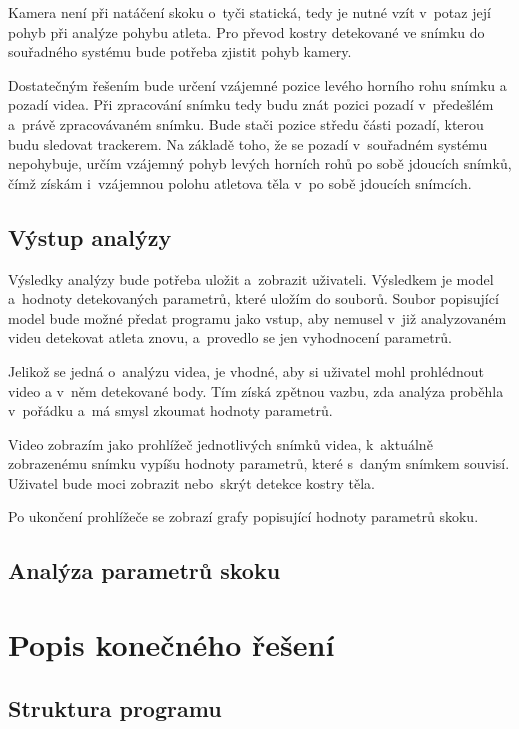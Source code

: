 Kamera není při natáčení skoku o~tyči statická, tedy je nutné vzít v~potaz její pohyb při analýze pohybu atleta. Pro převod kostry detekované ve snímku do souřadného systému bude potřeba zjistit pohyb kamery.

Dostatečným řešením bude určení vzájemné pozice levého horního rohu snímku a pozadí videa. Při zpracování snímku tedy budu znát pozici pozadí v~předešlém a~právě zpracovávaném snímku. Bude stači pozice středu části pozadí, kterou budu sledovat trackerem. Na základě toho, že se pozadí v~souřadném systému nepohybuje, určím vzájemný pohyb levých horních rohů po sobě jdoucích snímků, čímž získám i~vzájemnou polohu atletova těla v~po sobě jdoucích snímcích.

\subsection{Výstup analýzy}

Výsledky analýzy bude potřeba uložit a~zobrazit uživateli. Výsledkem je model a~hodnoty detekovaných parametrů, které uložím do souborů. Soubor popisující model bude možné předat programu jako vstup, aby nemusel v~již analyzovaném videu detekovat atleta znovu, a~provedlo se jen vyhodnocení parametrů.

Jelikož se jedná o~analýzu videa, je vhodné, aby si uživatel mohl prohlédnout video a v~něm detekované body. Tím získá zpětnou vazbu, zda analýza proběhla v~pořádku a~má smysl zkoumat hodnoty parametrů.

Video zobrazím jako prohlížeč jednotlivých snímků videa, k~aktuálně zobrazenému snímku vypíšu hodnoty parametrů, které s~daným snímkem souvisí. Uživatel bude moci zobrazit nebo~skrýt detekce kostry těla.

Po ukončení prohlížeče se zobrazí grafy popisující hodnoty parametrů skoku.

\subsection{Analýza parametrů skoku}



\section{Popis konečného řešení}

\subsection{Struktura programu}













